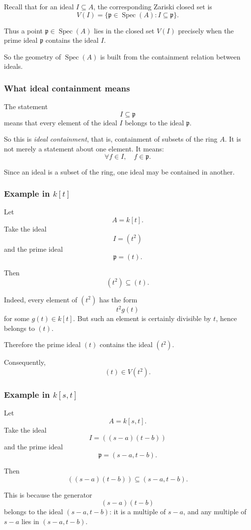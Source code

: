 \documentclass[12pt,a4paper]{article}
\theoremstyle{notespace}
\newcommand{\Spec}{\operatorname{Spec}}
\newcommand{\mf}{\mathfrak}
\theoremstyle{definition}
\begin{document}
Recall that for an ideal \(I \subseteq A\), the corresponding Zariski closed set is
\[
V(I)=\{\mf p \in \Spec(A): I \subseteq \mf p\}.
\]

Thus a point \(\mf p \in \Spec(A)\) lies in the closed set \(V(I)\) precisely when the prime ideal \(\mf p\) contains the ideal \(I\).

So the geometry of \(\Spec(A)\) is built from the containment relation between ideals.

\subsubsection{What ideal containment means}

The statement
\[
I \subseteq \mf p
\]
means that every element of the ideal \(I\) belongs to the ideal \(\mf p\).

So this is \emph{ideal containment}, that is, containment of subsets of the ring \(A\). It is not merely a statement about one element. It means:
\[
\forall f \in I,\quad f \in \mf p.
\]

Since an ideal is a subset of the ring, one ideal may be contained in another.

\subsubsection{Example in \(k[t]\)}

Let
\[
A=k[t].
\]
Take the ideal
\[
I=(t^2)
\]
and the prime ideal
\[
\mf p=(t).
\]

Then
\[
(t^2)\subseteq (t).
\]

Indeed, every element of \((t^2)\) has the form
\[
t^2 g(t)
\]
for some \(g(t)\in k[t]\). But such an element is certainly divisible by \(t\), hence belongs to \((t)\).

Therefore the prime ideal \((t)\) contains the ideal \((t^2)\).

Consequently,
\[
(t)\in V(t^2).
\]

\subsubsection{Example in \(k[s,t]\)}

Let
\[
A=k[s,t].
\]
Take the ideal
\[
I=((s-a)(t-b))
\]
and the prime ideal
\[
\mf p=(s-a,t-b).
\]

Then
\[
((s-a)(t-b))\subseteq (s-a,t-b).
\]

This is because the generator
\[
(s-a)(t-b)
\]
belongs to the ideal \((s-a,t-b)\): it is a multiple of \(s-a\), and any multiple of \(s-a\) lies in \((s-a,t-b)\).
\end{document}

